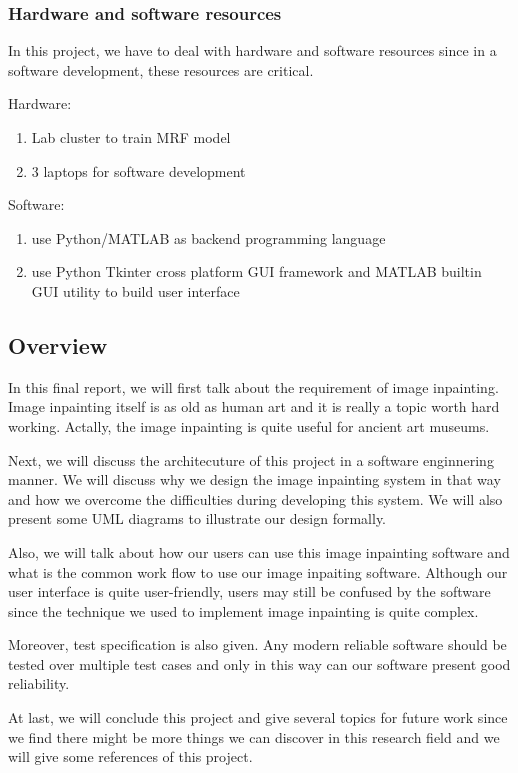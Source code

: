 \subsubsection{Hardware and software resources}
In this project, we have to deal with hardware and software resources since 
in a software development, these resources are critical.

Hardware:
\begin{enumerate}
\item Lab cluster to train MRF model
\item 3 laptops for software development
\end{enumerate}

Software:
\begin{enumerate}
\item use Python/MATLAB as backend programming language
\item use Python Tkinter cross platform GUI framework and MATLAB builtin
    GUI utility to build user interface
\end{enumerate}

\subsection{Overview}
In this final report, we will first talk about the requirement of image
inpainting. Image inpainting itself is as old as human art and it is really
a topic worth hard working. Actally, the image inpainting is quite useful
for ancient art museums.

Next, we will discuss the architecuture of this project in a software
enginnering manner. We will discuss why we design the image inpainting
system in that way and how we overcome the difficulties during developing
this system. We will also present some UML diagrams to illustrate our
design formally.

Also, we will talk about how our users can use this image inpainting 
software and what is the common work flow to use our image inpaiting
software. Although our user interface is quite user-friendly, users may
still be confused by the software since the technique we used to implement
image inpainting is quite complex.

Moreover, test specification is also given. Any modern reliable software
should be tested over multiple test cases and only in this way can our
software present  good reliability.

At last, we will conclude this project and give several topics for future
work since we find there might be more things we can discover in this
research field and we will give some references of this project.

